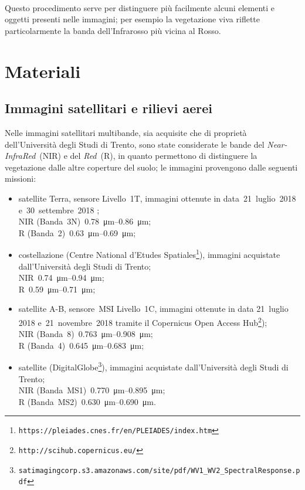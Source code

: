 %
\\
Questo procedimento serve per distinguere più facilmente alcuni elementi e oggetti presenti nelle immagini; per esempio la vegetazione viva riflette particolarmente la banda dell'Infrarosso più vicina al Rosso.



\section{Materiali}
\subsection{Immagini satellitari e rilievi aerei}
Nelle immagini satellitari multibande, sia acquisite che di proprietà dell'Università degli Studi di Trento, sono state considerate le bande del \emph{Near-InfraRed}~(NIR) e del \emph{Red}~(R), in quanto permettono di distinguere la vegetazione dalle altre coperture del suolo;
le immagini provengono dalle seguenti missioni:
%
\begin{itemize}
	\item satellite Terra, sensore \AST{} Livello~1T, immagini ottenute in data~21~luglio~2018 e~30~settembre~2018 ;  
		\\
		NIR (Banda~3N)~\SIrange[range-phrase={-}]{0.78}{0.86}{\micro\m};
		\\
		R (Banda~2)~\SIrange[range-phrase={-}]{0.63}{0.69}{\micro\m};
	\item costellazione \Pl{} 
	(Centre National d'Etudes Spatiales\footnote{\texttt{https://pleiades.cnes.fr/en/PLEIADES/index.htm}}), immagini acquistate dall'Università degli Studi di Trento; 
		\\
		NIR~\SIrange[range-phrase={-}]{0.74}{0.94}{\micro\m};
		\\
		R~\SIrange[range-phrase={-}]{0.59}{0.71}{\micro\m};
	\item satellite \Se{}A-B, sensore~MSI Livello~1C, immagini ottenute in data 21~luglio 2018 e~21~novembre~2018 tramite il
	Copernicus Open Access Hub\footnote{\texttt{http://scihub.copernicus.eu/}});
		\\
		NIR (Banda~8)~\SIrange[range-phrase={-}]{0.763}{0.908}{\micro\m};
		\\
		R (Banda~4)~\SIrange[range-phrase={-}]{0.645}{0.683}{\micro\m};
	\item satellite \WV{}
	(DigitalGlobe\footnote{\texttt{satimagingcorp.s3.amazonaws.com/site/pdf/WV1\_{}WV2\_{}SpectralResponse.pdf}}), immagini acquistate dall'Università degli Studi di Trento;
		\\
		NIR (Banda~MS1)~\SIrange[range-phrase={-}]{0.770}{0.895}{\micro\m};
		\\
		R (Banda~MS2)~\SIrange[range-phrase={-}]{0.630}{0.690}{\micro\m}.
\end{itemize}
